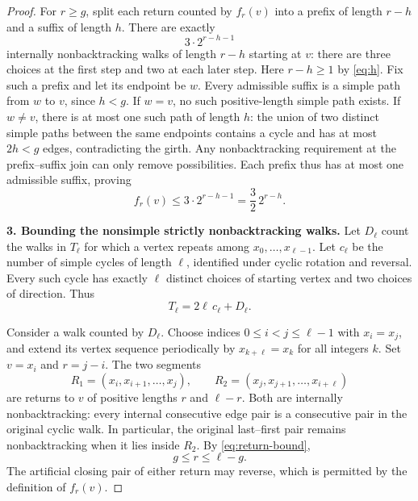 \documentclass[11pt,a4paper]{article}
\begin{document}
\begin{proof}
For $r\ge g$, split each return counted by $f_r(v)$ into a prefix of
length $r-h$ and a suffix of length $h$. There are exactly
\[
  3\cdot2^{r-h-1}
\]
internally nonbacktracking walks of length $r-h$ starting at $v$:
there are three choices at the first step and two at each later
step. Here $r-h\ge1$ by \eqref{eq:h}.
Fix such a prefix and let its endpoint be $w$.
Every admissible suffix is a simple path from $w$ to $v$, since
$h<g$. If $w=v$, no such positive-length simple path exists.
If $w\ne v$, there is at most one such path of length $h$:
the union of two distinct simple paths between the same endpoints
contains a cycle and has at most $2h<g$ edges, contradicting the
girth. Any nonbacktracking requirement at the prefix--suffix join
can only remove possibilities. Each prefix thus has at most one
admissible suffix, proving
\[
  f_r(v)\le3\cdot2^{r-h-1}
  =\frac32\,2^{r-h}.
\]

\medskip
\noindent\textbf{3. Bounding the nonsimple strictly nonbacktracking walks.}
Let $D_\ell$ count the walks in $T_\ell$ for which a vertex repeats
among $x_0,\ldots,x_{\ell-1}$. Let $c_\ell$ be the number of simple
cycles of length $\ell$, identified under cyclic rotation and
reversal. Every such cycle has exactly $\ell$ distinct choices of
starting vertex and two choices of direction. Thus
\begin{equation}\label{eq:cycle-count}
  T_\ell=2\ell\,c_\ell+D_\ell.
\end{equation}

Consider a walk counted by $D_\ell$. Choose indices
$0\le i<j\le\ell-1$ with $x_i=x_j$, and extend its vertex sequence
periodically by $x_{k+\ell}=x_k$ for all integers $k$.
Set $v=x_i$ and $r=j-i$.
The two segments
\[
  R_1=(x_i,x_{i+1},\ldots,x_j),
  \qquad
  R_2=(x_j,x_{j+1},\ldots,x_{i+\ell})
\]
are returns to $v$ of positive lengths $r$ and $\ell-r$.
Both are internally nonbacktracking: every internal consecutive
edge pair is a consecutive pair in the original cyclic walk.
In particular, the original last--first pair remains nonbacktracking
when it lies inside $R_2$. By \eqref{eq:return-bound},
\begin{equation}\label{eq:split-range}
  g\le r\le\ell-g.
\end{equation}
The artificial closing pair of either return may reverse, which is
permitted by the definition of $f_r(v)$.


\end{proof}
\end{document}
